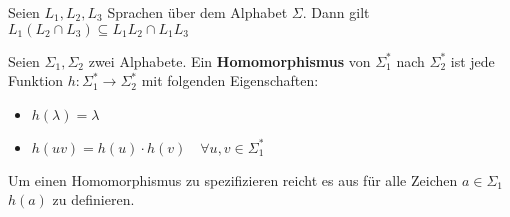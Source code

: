\begin{lemma}
Seien $L_1, L_2, L_3$ Sprachen über dem Alphabet $\Sigma$. Dann gilt $L_1 (L_2 \cap L_3) \subseteq L_1 L_2 \cap L_1 L_3$\\
\end{lemma}

\begin{definition}
Seien $\Sigma_1, \Sigma_2$ zwei Alphabete. Ein \textbf{Homomorphismus} von $\Sigma_1^*$ nach $\Sigma_2^*$ ist jede Funktion $h: \Sigma_1^* \to \Sigma_2^*$ mit folgenden Eigenschaften:
\begin{itemize}
  \item $h(\lambda) = \lambda$
  \item $h(uv) = h(u) \cdot h(v) \quad \forall u,v \in \Sigma_1^*$\\
\end{itemize}
\end{definition}

\begin{remark}
Um einen Homomorphismus zu spezifizieren reicht es aus für alle Zeichen $a \in \Sigma_1$ $h(a)$ zu definieren.
\end{remark}


